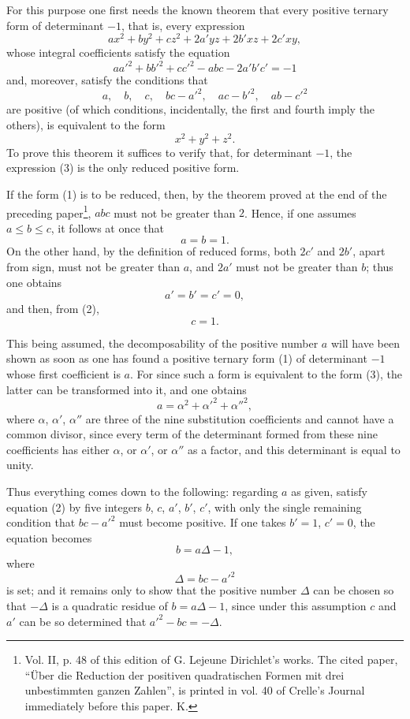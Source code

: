 \documentclass[11pt]{article}
\begin{document}
For this purpose one first needs the known theorem that every positive ternary form of determinant $-1$, that is, every expression
\begin{equation}\tag{1}
 ax^2+by^2+cz^2+2a'yz+2b'xz+2c'xy,
\end{equation}
whose integral coefficients satisfy the equation
\begin{equation}\tag{2}
 aa'^2+bb'^2+cc'^2-abc-2a'b'c'=-1
\end{equation}
and, moreover, satisfy the conditions that
\[
 a,\quad b,\quad c,\quad bc-a'^2,\quad ac-b'^2,\quad ab-c'^2
\]
are positive (of which conditions, incidentally, the first and fourth imply the others), is equivalent to the form
\begin{equation}\tag{3}
 x^2+y^2+z^2.
\end{equation}
To prove this theorem it suffices to verify that, for determinant $-1$, the expression (3) is the only reduced positive form.

If the form (1) is to be reduced, then, by the theorem proved at the end of the preceding paper\footnote{Vol. II, p. 48 of this edition of G. Lejeune Dirichlet's works. The cited paper, ``Über die Reduction der positiven quadratischen Formen mit drei unbestimmten ganzen Zahlen'', is printed in vol. 40 of Crelle's Journal immediately before this paper. K.}, $abc$ must not be greater than $2$. Hence, if one assumes $a\leq b\leq c$, it follows at once that
\[
 a=b=1.
\]
On the other hand, by the definition of reduced forms, both $2c'$ and $2b'$, apart from sign, must not be greater than $a$, and $2a'$ must not be greater than $b$; thus one obtains
\[
 a'=b'=c'=0,
\]
and then, from (2),
\[
 c=1.
\]

This being assumed, the decomposability of the positive number $a$ will have been shown as soon as one has found a positive ternary form (1) of determinant $-1$ whose first coefficient is $a$. For since such a form is equivalent to the form (3), the latter can be transformed into it, and one obtains
\[
 a=\alpha^2+\alpha'^2+\alpha''^2,
\]
where $\alpha$, $\alpha'$, $\alpha''$ are three of the nine substitution coefficients and cannot have a common divisor, since every term of the determinant formed from these nine coefficients has either $\alpha$, or $\alpha'$, or $\alpha''$ as a factor, and this determinant is equal to unity.

Thus everything comes down to the following: regarding $a$ as given, satisfy equation (2) by five integers $b$, $c$, $a'$, $b'$, $c'$, with only the single remaining condition that $bc-a'^2$ must become positive. If one takes $b'=1$, $c'=0$, the equation becomes
\[
 b=a\Delta-1,
\]
where
\[
 \Delta=bc-a'^2
\]
is set; and it remains only to show that the positive number $\Delta$ can be chosen so that $-\Delta$ is a quadratic residue of $b=a\Delta-1$, since under this assumption $c$ and $a'$ can be so determined that $a'^2-bc=-\Delta$.
\end{document}
